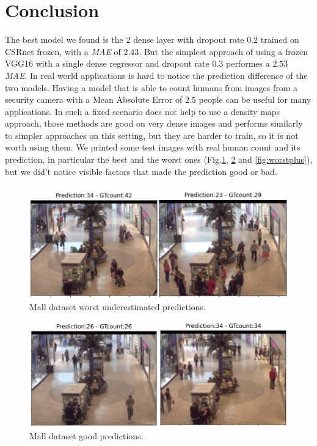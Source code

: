 \documentclass[10pt,twocolumn,letterpaper]{article}
\begin{document}
\section{Conclusion}
The best model we found is the 2 dense layer with dropout rate 0.2 trained on CSRnet frozen, with a \textit{MAE} of $2.43$. But the simplest approach of using a frozen VGG16 with a single dense regressor and dropout rate $0.3$ performes a $2.53$ \textit{MAE}. In real world applications is hard to notice the prediction difference of the two models. Having a model that is able to count humans from images from a security camera with a Mean Absolute Error of $2.5$ people can be useful for many applications. In such a fixed scenario does not help to use a density maps approach, those methods are good on very dense images and performs similarly to simpler approaches on this setting, but they are harder to train, so it is not worth using them. We printed some test images with real human count and its prediction, in particular the best and the worst ones (Fig.\ref{fig:worst}, \ref{fig:best} and \ref{fig:worstplus}), but we did't notice visible factors that made the prediction good or bad. 

\begin{figure}[h!]%
	\includegraphics[width=1\columnwidth]{pics/low.png}
	\centering
	\caption{Mall dataset worst underestimated predictions.}
	\centering
	\label{fig:worst}
\end{figure}

\begin{figure}[h!]%
	\includegraphics[width=1\columnwidth]{pics/perfect.png}
	\centering
	\caption{Mall dataset good predictions.}
	\centering
	\label{fig:best}
\end{figure}
\end{document}
